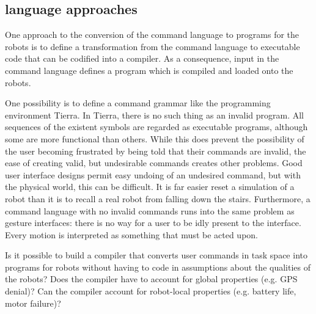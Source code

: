 \documentclass[]{article}
\begin{document}
\subsection {language approaches}

One approach to the conversion of the command language to programs for the robots is to define a transformation from the command language to executable code that can be codified into a compiler. 
As a consequence, input in the command language defines a program which is compiled and loaded onto the robots. 

One possibility is to define a command grammar like the programming environment Tierra.  
In Tierra, there is no such thing as an invalid program. 
All sequences of the existent symbols are regarded as executable programs, although some are more functional than others. 
While this does prevent the possibility of the user becoming frustrated by being told that their commands are invalid, the ease of creating valid, but undesirable commands creates other problems. 
Good user interface designs permit easy undoing of an undesired command, but with the physical world, this can be difficult. 
It is far easier reset a simulation of a robot than it is to recall a real robot from falling down the stairs. 
Furthermore, a command language with no invalid commands runs into the same problem as gesture interfaces: there is no way for a user to be idly present to the interface.
Every motion is interpreted as something that must be acted upon. 

Is it possible to build a compiler that converts user commands in task space into programs for robots without having to code in assumptions about the qualities of the robots? Does the compiler have to account for global properties (e.g. GPS denial)? Can the compiler account for robot-local properties (e.g. battery life, motor failure)?
\end{document}
